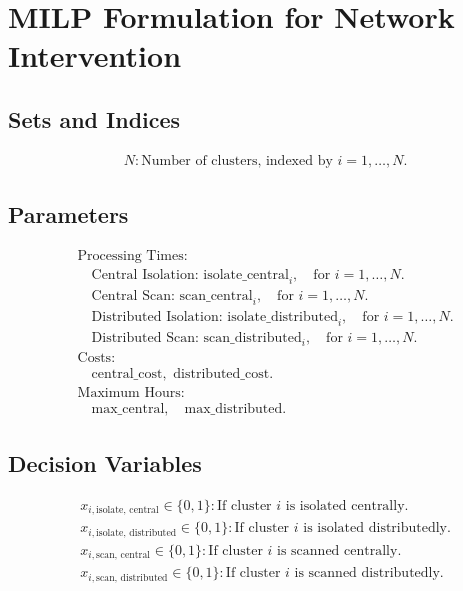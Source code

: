 \documentclass{article}
\begin{document}
\section*{MILP Formulation for Network Intervention}

\subsection*{Sets and Indices}
\begin{align*}
    &N: \text{Number of clusters, indexed by } i = 1, \ldots, N.
\end{align*}

\subsection*{Parameters}
\begin{align*}
    &\text{Processing Times:} \\
    &\quad \text{Central Isolation: } \text{isolate\_central}_i, \quad \text{for } i = 1, \ldots, N. \\
    &\quad \text{Central Scan: } \text{scan\_central}_i, \quad \text{for } i = 1, \ldots, N. \\
    &\quad \text{Distributed Isolation: } \text{isolate\_distributed}_i, \quad \text{for } i = 1, \ldots, N. \\
    &\quad \text{Distributed Scan: } \text{scan\_distributed}_i, \quad \text{for } i = 1, \ldots, N. \\
    &\text{Costs:} \\
    &\quad \text{central\_cost}, \text{ distributed\_cost}. \\
    &\text{Maximum Hours:} \\
    &\quad \text{max\_central}, \quad \text{max\_distributed}.
\end{align*}

\subsection*{Decision Variables}
\begin{align*}
    &x_{i, \text{isolate, central}} \in \{0, 1\}: \text{If cluster } i \text{ is isolated centrally.} \\
    &x_{i, \text{isolate, distributed}} \in \{0, 1\}: \text{If cluster } i \text{ is isolated distributedly.} \\
    &x_{i, \text{scan, central}} \in \{0, 1\}: \text{If cluster } i \text{ is scanned centrally.} \\
    &x_{i, \text{scan, distributed}} \in \{0, 1\}: \text{If cluster } i \text{ is scanned distributedly.}
\end{align*}
\end{document}
